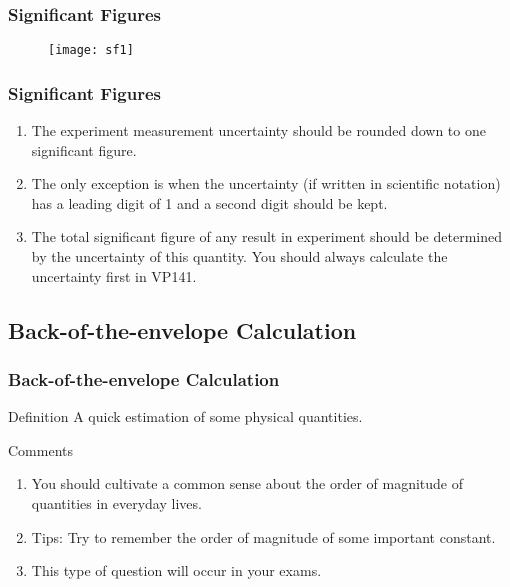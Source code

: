 \documentclass{beamer}
\begin{document}
\begin{frame}
    \frametitle{Significant Figures}
    
    \begin{figure}
    \texttt{[image: sf1]}
    \end{figure}
    

\end{frame}

\begin{frame}
    \frametitle{Significant Figures}
    \begin{enumerate}
        \item The experiment measurement uncertainty should be rounded down to one significant figure.
        \item The only exception is when the uncertainty (if written in scientific notation) has a leading digit of 1 and a second digit should be kept.
        \item The total significant figure of any result in experiment should be determined by the uncertainty of this quantity. You should always calculate the uncertainty first in VP141.
    \end{enumerate}
    
    

\end{frame}
\subsection{Back-of-the-envelope Calculation}
\begin{frame}
    \frametitle{Back-of-the-envelope Calculation}
    \begin{block}{Definition}
        A quick estimation of some physical quantities.
    \end{block}
        
    \begin{block}{Comments}
        \begin{enumerate}
            \item  You should cultivate a common sense about the order of magnitude of quantities in everyday lives.
            \item  Tips: Try to remember the order of magnitude of some important constant.
            \item  This type of question will occur in your exams.
        \end{enumerate}
       
        
    \end{block}
 
\end{frame}
\end{document}
